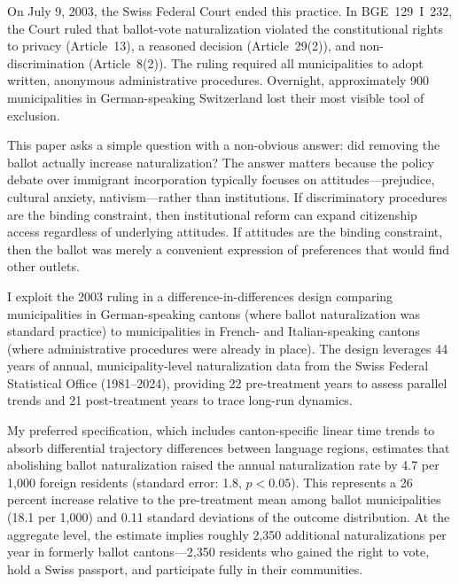 \documentclass[12pt]{article}
\begin{document}
On July 9, 2003, the Swiss Federal Court ended this practice. In BGE~129~I~232, the Court ruled that ballot-vote naturalization violated the constitutional rights to privacy (Article~13), a reasoned decision (Article~29(2)), and non-discrimination (Article~8(2)). The ruling required all municipalities to adopt written, anonymous administrative procedures. Overnight, approximately 900 municipalities in German-speaking Switzerland lost their most visible tool of exclusion.

This paper asks a simple question with a non-obvious answer: did removing the ballot actually increase naturalization? The answer matters because the policy debate over immigrant incorporation typically focuses on attitudes---prejudice, cultural anxiety, nativism---rather than institutions. If discriminatory procedures are the binding constraint, then institutional reform can expand citizenship access regardless of underlying attitudes. If attitudes are the binding constraint, then the ballot was merely a convenient expression of preferences that would find other outlets.

I exploit the 2003 ruling in a difference-in-differences design comparing municipalities in German-speaking cantons (where ballot naturalization was standard practice) to municipalities in French- and Italian-speaking cantons (where administrative procedures were already in place). The design leverages 44 years of annual, municipality-level naturalization data from the Swiss Federal Statistical Office (1981--2024), providing 22 pre-treatment years to assess parallel trends and 21 post-treatment years to trace long-run dynamics.

My preferred specification, which includes canton-specific linear time trends to absorb differential trajectory differences between language regions, estimates that abolishing ballot naturalization raised the annual naturalization rate by 4.7 per 1,000 foreign residents (standard error: 1.8, $p < 0.05$). This represents a 26 percent increase relative to the pre-treatment mean among ballot municipalities (18.1 per 1,000) and 0.11 standard deviations of the outcome distribution. At the aggregate level, the estimate implies roughly 2,350 additional naturalizations per year in formerly ballot cantons---2,350 residents who gained the right to vote, hold a Swiss passport, and participate fully in their communities.
\end{document}
